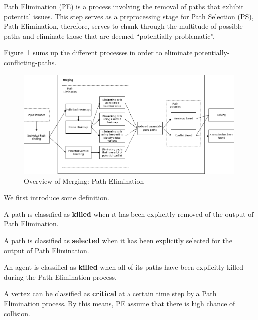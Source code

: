 Path Elimination (PE) is a process involving the removal of paths that exhibit potential issues. This step serves as a preprocessing stage for Path Selection (PS), Path Elimination, therefore, serves to chunk through the multitude of possible paths and eliminate those that are deemed ``potentially problematic''.

Figure~\ref{fig:overview_merging_path_elemination} sums up the different processes in order to eliminate potentially-conflicting-paths.

\begin{figure}[H]
    \centering
    \caption{Overview of Merging: Path Elimination}\label{fig:overview_merging_path_elemination}
    \includegraphics[width=\widthimg]{img/overview_merging_path_elimination.drawio.png}
\end{figure}

We first introduce some definition.

\begin{definition}
    A path is classified as \textbf{killed} when it has been explicitly removed of the output of Path Elimination.
\end{definition}

\begin{definition}
    A path is classified as \textbf{selected} when it has been explicitly selected for the output of Path Elimination.
\end{definition}

\begin{definition}
    An agent is classified as \textbf{killed} when all of its paths have been explicitly killed during the Path Elimination process.
\end{definition}

\begin{definition}
    A vertex can be classified as \textbf{critical} at a certain time step by a Path Elimination process. By this means, PE assume that there is high chance of collision.
\end{definition}

